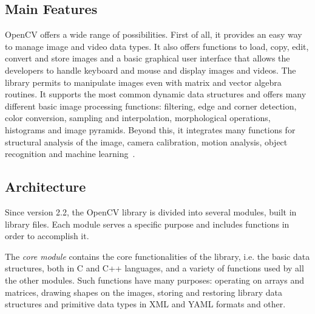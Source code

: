 	\subsection{Main Features}
	\mbox{OpenCV} offers a wide range of possibilities. First of all, it provides an easy way to manage image and video data types. It also offers functions to load, copy, edit, convert and store images and a basic graphical user interface that allows the developers to handle keyboard and mouse and display images and videos. The library permits to manipulate images even with matrix and vector algebra routines. It supports the most common dynamic data structures and offers many different basic image processing functions: filtering, edge and corner detection, color conversion, sampling and interpolation, morphological operations, histograms and image pyramids. Beyond this, it integrates many functions for structural analysis of the image, camera calibration, motion analysis, object recognition and machine learning~\cite{Agam2006}.

	
	\subsection{Architecture}
	Since version 2.2, the \mbox{OpenCV} library is divided into several modules, built in library files. Each module serves a specific purpose and includes functions in order to accomplish it. 

	The \emph{core module} contains the core functionalities of the library, i.e. the basic data structures, both in C and \mbox{C++} languages, and a variety of functions used by all the other modules. Such functions have many purposes: operating on arrays and matrices, drawing shapes on the images, storing and restoring library data structures and primitive data types in \mbox{XML} and \mbox{YAML} formats and other.
	
